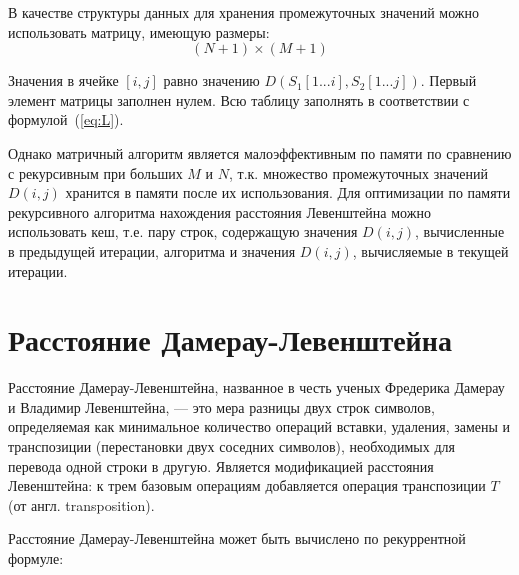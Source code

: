 В качестве структуры данных для хранения промежуточных значений можно использовать матрицу, имеющую размеры:
\begin{equation}
	\label{eq:lev-m-size}
	(N + 1) \times (M + 1)
\end{equation}

Значения в ячейке $[i, j]$ равно значению $D(S_{1}[1...i], S_{2}[1...j])$. Первый элемент матрицы заполнен нулем. Всю таблицу заполнять в соответствии с формулой~(\ref{eq:L}). 

Однако матричный алгоритм является малоэффективным по памяти по сравнению с рекурсивным при больших $M$ и $N$, т.к. множество промежуточных значений $D(i,j)$ хранится в памяти после их использования. Для оптимизации по памяти рекурсивного алгоритма нахождения расстояния Левенштейна можно использовать кеш, т.е. пару строк, содержащую значения $D(i,j)$, вычисленные в предыдущей итерации, алгоритма и значения $D(i,j)$, вычисляемые в текущей итерации.

\section{Расстояние Дамерау-Левенштейна}
Расстояние Дамерау-Левенштейна, названное в честь ученых Фредерика Дамерау и Владимир Левенштейна, --- это мера разницы двух строк символов, определяемая как минимальное количество операций вставки, удаления, замены и транспозиции (перестановки двух соседних символов), необходимых для перевода одной строки в другую. Является модификацией расстояния Левенштейна: к трем базовым операциям добавляется операция транспозиции $T$ (от англ. transposition).

Расстояние Дамерау-Левенштейна может быть вычислено по рекуррентной формуле:


